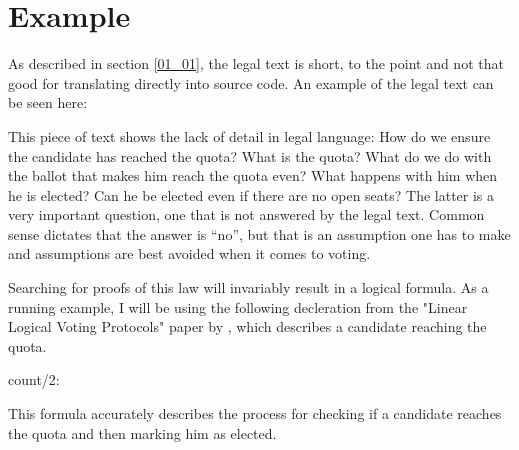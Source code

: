 \section{Example}
\label{02_01}

As described in section \ref{01_01}, the legal text is short, to the point and not that good for translating directly into source code. An example of the legal text can be seen here:


This piece of text shows the lack of detail in legal language: How do we ensure the candidate has reached the quota? What is the quota? What do we do with the ballot that makes him reach the quota even? What happens with him when he is elected? Can he be elected even if there are no open seats? The latter is a very important question, one that is not answered by the legal text. Common sense dictates that the answer is “no”, but that is an assumption one has to make and assumptions are best avoided when it comes to voting.  

Searching for proofs of this law will invariably result in a logical formula. As a running example, I will be using the following decleration from the "Linear Logical Voting Protocols"\cite{Deyoung11} paper by \citeauthor{Deyoung11}, which describes a candidate reaching the quota.

\begin{textoform}
	count/2: \\
\end{textoform}

This formula accurately describes the process for checking if a candidate reaches the quota and then marking him as elected.



